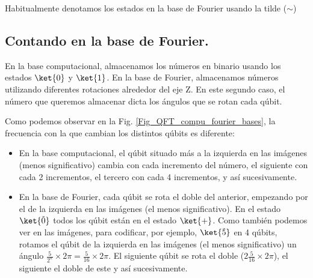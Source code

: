 \documentclass[a4paper,11pt]{book} %
\numberwithin{equation}{chapter}
\begin{document}
Habitualmente denotamos los estados en la base de Fourier usando la tilde ($\sim$)

		\subsection{Contando en la base de Fourier.}

En la base computacional, almacenamos los números en binario usando los estados $\ket{0}$ y $\ket{1}$. En la base de Fourier, almacenamos números utilizando diferentes rotaciones alrededor del eje Z. En este segundo caso, el número que queremos almacenar dicta los ángulos que se rotan cada qúbit. 

Como podemos observar en la Fig. \ref{Fig_QFT_compu_fourier_bases}, 
la frecuencia con la que cambian los distintos qúbits es diferente:
\begin{itemize}
	\item En la base computacional, el qúbit situado más a la izquierda en las imágenes (menos significativo) cambia con cada incremento del número, el siguiente con cada 2 incrementos, el tercero con cada 4 incrementos, y así sucesivamente.
	\item En la base de Fourier, cada qúbit se rota el doble del anterior, empezando por el de la izquierda en las imágenes (el menos significativo). En el estado $\ket{\tilde{0}}$ todos los qúbit están en el estado $\ket{+}$. Como también podemos ver en las imágenes, para codificar, por ejemplo, $\ket{\tilde{5}}$ en 4 qúbits, rotamos el qúbit de la izquierda en las imágenes (el menos significativo) un ángulo $\frac{5}{2^n} \times 2 \pi = \frac{5}{16} \times 2 \pi $. El siguiente qúbit se rota el doble ($2 \frac{5}{16} \times 2 \pi$), el siguiente el doble de este y así sucesivamente.
\end{itemize}
\end{document}
